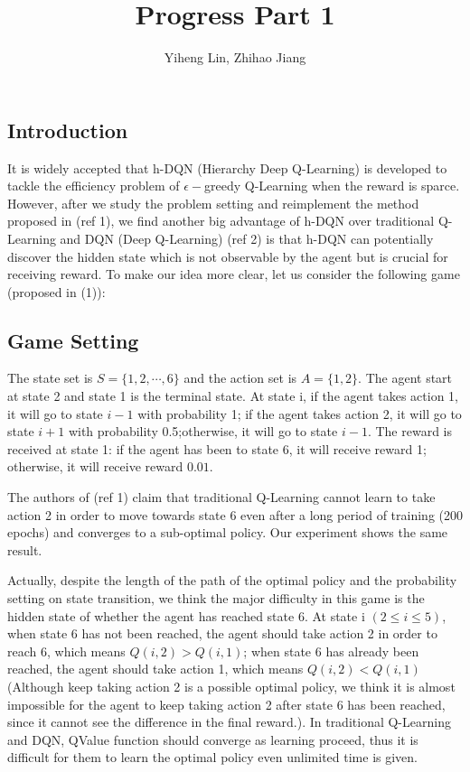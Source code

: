 \documentclass{article}
\title{\textmd{\bf Progress Part 1}}
\date{}
\author{Yiheng Lin, Zhihao Jiang}
\begin{document}
    \begin{spacing}{1.1}
    \maketitle %

    \section*{Introduction}
    It is widely accepted that h-DQN (Hierarchy Deep Q-Learning) is developed to tackle the efficiency problem of $\epsilon -$greedy Q-Learning when the reward is sparce. However, after we study the problem setting and reimplement the method proposed in (ref 1), we find another big advantage of h-DQN over traditional Q-Learning and DQN (Deep Q-Learning) (ref 2) is that h-DQN can potentially discover the hidden state which is not observable by the agent but is crucial for receiving reward. To make our idea more clear, let us consider the following game (proposed in (1)):
    \subsection*{Game Setting}
    The state set is $S = \{1, 2, \cdots, 6\}$ and the action set is $A = \{1, 2\}$. The agent start at state 2 and state 1 is the terminal state. At state i, if the agent takes action 1, it will go to state $i-1$ with probability 1; if the agent takes action 2, it will go to state $i+1$ with probability 0.5;otherwise, it will go to state $i-1$. The reward is received at state 1: if the agent has been to state 6, it will receive reward 1; otherwise, it will receive reward $0.01$.

    The authors of (ref 1) claim that traditional Q-Learning cannot learn to take action 2 in order to move towards state 6 even after a long period of training (200 epochs) and converges to a sub-optimal policy. Our experiment shows the same result. 
    
    Actually, despite the length of the path of the optimal policy and the probability setting on state transition, we think the major difficulty in this game is the hidden state of whether the agent has reached state 6. At state i $(2\leq i\leq 5)$, when state 6 has not been reached, the agent should take action 2 in order to reach 6, which means $Q(i, 2) > Q(i, 1)$; when state 6 has already been reached, the agent should take action 1, which means $Q(i, 2) < Q(i, 1)$ (Although keep taking action 2 is a possible optimal policy, we think it is almost impossible for the agent to keep taking action 2 after state 6 has been reached, since it cannot see the difference in the final reward.). In traditional Q-Learning and DQN, QValue function should converge as learning proceed, thus it is difficult for them to learn the optimal policy even unlimited time is given. 
    

\end{spacing}
\end{document}
